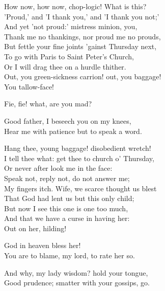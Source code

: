 \begin{speech}
How now, how now, chop-logic! What is this? \\
'Proud,' and 'I thank you,' and 'I thank you not;' \\
And yet 'not proud:' mistress minion, you, \\
Thank me no thankings, nor proud me no prouds, \\
But fettle your fine joints 'gainst Thursday next, \\
To go with Paris to Saint Peter's Church, \\
Or I will drag thee on a hurdle thither. \\
Out, you green-sickness carrion! out, you baggage! \\
You tallow-face! \\
\end{speech}
\begin{speech}
Fie, fie! what, are you mad? \\
\end{speech}
\begin{speech}
Good father, I beseech you on my knees, \\
Hear me with patience but to speak a word. \\
\end{speech}
\begin{speech}
Hang thee, young baggage! disobedient wretch! \\
I tell thee what: get thee to church o' Thursday, \\
Or never after look me in the face: \\
Speak not, reply not, do not answer me; \\
My fingers itch. Wife, we scarce thought us blest \\
That God had lent us but this only child; \\
But now I see this one is one too much, \\
And that we have a curse in having her: \\
Out on her, hilding! \\
\end{speech}
\begin{speech}
God in heaven bless her! \\
You are to blame, my lord, to rate her so. \\
\end{speech}
\begin{speech}
And why, my lady wisdom? hold your tongue, \\
Good prudence; smatter with your gossips, go. \\
\end{speech}
